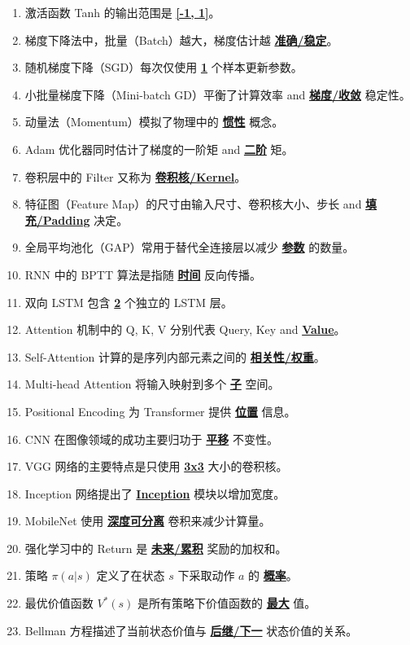 \documentclass[12pt,a4paper,openany]{ctexbook}
\begin{document}
\begin{enumerate}[resume,leftmargin=2em,itemsep=1pt]
\item 激活函数 Tanh 的输出范围是 \underline{\textbf{[-1, 1]}}。
\item 梯度下降法中，批量（Batch）越大，梯度估计越 \underline{\textbf{准确/稳定}}。
\item 随机梯度下降（SGD）每次仅使用 \underline{\textbf{1}} 个样本更新参数。
\item 小批量梯度下降（Mini-batch GD）平衡了计算效率 and \underline{\textbf{梯度/收敛}} 稳定性。
\item 动量法（Momentum）模拟了物理中的 \underline{\textbf{惯性}} 概念。
\item Adam 优化器同时估计了梯度的一阶矩 and \underline{\textbf{二阶}} 矩。
\item 卷积层中的 Filter 又称为 \underline{\textbf{卷积核/Kernel}}。
\item 特征图（Feature Map）的尺寸由输入尺寸、卷积核大小、步长 and \underline{\textbf{填充/Padding}} 决定。
\item 全局平均池化（GAP）常用于替代全连接层以减少 \underline{\textbf{参数}} 的数量。
\item RNN 中的 BPTT 算法是指随 \underline{\textbf{时间}} 反向传播。
\item 双向 LSTM 包含 \underline{\textbf{2}} 个独立的 LSTM 层。
\item Attention 机制中的 Q, K, V 分别代表 Query, Key and \underline{\textbf{Value}}。
\item Self-Attention 计算的是序列内部元素之间的 \underline{\textbf{相关性/权重}}。
\item Multi-head Attention 将输入映射到多个 \underline{\textbf{子}} 空间。
\item Positional Encoding 为 Transformer 提供 \underline{\textbf{位置}} 信息。
\item CNN 在图像领域的成功主要归功于 \underline{\textbf{平移}} 不变性。
\item VGG 网络的主要特点是只使用 \underline{\textbf{3x3}} 大小的卷积核。
\item Inception 网络提出了 \underline{\textbf{Inception}} 模块以增加宽度。
\item MobileNet 使用 \underline{\textbf{深度可分离}} 卷积来减少计算量。
\item 强化学习中的 Return 是 \underline{\textbf{未来/累积}} 奖励的加权和。
\item 策略 $\pi(a|s)$ 定义了在状态 $s$ 下采取动作 $a$ 的 \underline{\textbf{概率}}。
\item 最优价值函数 $V^*(s)$ 是所有策略下价值函数的 \underline{\textbf{最大}} 值。
\item Bellman 方程描述了当前状态价值与 \underline{\textbf{后继/下一}} 状态价值的关系。

\end{enumerate}
\end{document}
